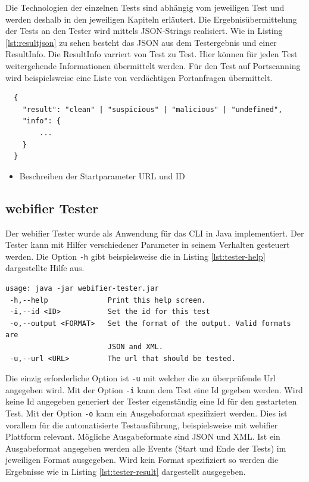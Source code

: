 Die Technologien der einzelnen Tests sind abhängig vom jeweiligen Test und werden deshalb in den
jeweiligen Kapiteln erläutert. Die Ergebnisübermittelung der Tests an den Tester wird mittels
\ac{JSON}-Strings realisiert. Wie in Listing \ref{lst:resultjson} zu sehen besteht das \ac{JSON} aus dem
Testergebnis und einer ResultInfo. Die ResultInfo varriert von Test zu Test. Hier können für jeden Test weitergehende Informationen übermittelt werden. Für den Test auf Portscanning wird beispielsweise eine Liste von verdächtigen Portanfragen übermittelt.

\begin{scriptsize}
\begin{lstlisting}
  {
  	"result": "clean" | "suspicious" | "malicious" | "undefined",
  	"info": {
  		...
  	}
  }
\end{lstlisting}
\end{scriptsize}

\begin{itemize}
  \item Beschreiben der Startparameter URL und ID
\end{itemize}

\subsection{webifier Tester}

Der webifier Tester wurde als Anwendung für das \ac{CLI} in Java implementiert. Der Tester kann mit Hilfer verschiedener Parameter in seinem Verhalten gesteuert werden. Die Option \lstinline[style=eclipse]{-h} gibt beispielsweise die in Listing \ref{lst:tester-help} dargestellte Hilfe aus.

\begin{scriptsize}
\begin{lstlisting}
usage: java -jar webifier-tester.jar
 -h,--help              Print this help screen.
 -i,--id <ID>           Set the id for this test
 -o,--output <FORMAT>   Set the format of the output. Valid formats are
                        JSON and XML.
 -u,--url <URL>         The url that should be tested.
\end{lstlisting}
\end{scriptsize}

Die einzig erforderliche Option ist \lstinline[style=eclipse]{-u} mit welcher die zu überprüfende Url angegeben wird. Mit der Option \lstinline[style=eclipse]{-i} kann dem Test eine Id gegeben werden. Wird keine Id angegeben generiert der Tester eigenständig eine Id für den gestarteten Test. Mit der Option \lstinline[style=eclipse]{-o} kann ein Ausgebaformat spezifiziert werden. Dies ist vorallem für die automatisierte Testausführung, beispielsweise mit webifier Plattform relevant. Mögliche Ausgabeformate sind \ac{JSON} und \ac{XML}. Ist ein Ausgabeformat angegeben werden alle Events (Start und Ende der Tests) im jeweiligen Format ausgegeben. Wird kein Format spezifiziert so werden die Ergebnisse wie in Listing \ref{lst:tester-result} dargestellt ausgegeben.

